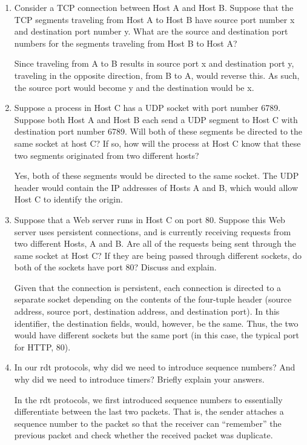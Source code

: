 \begin{enumerate}

  \item Consider a TCP connection between Host A and Host B. Suppose that the TCP segments traveling from Host A to Host B have source port number x and destination port number y. What are the source and destination port numbers for the segments traveling from Host B to Host A?  

    Since traveling from A to B results in source port x and destination port y, traveling in the opposite direction, from B to A, would reverse this. As such, the source port would become y and the destination would be x.

  \item Suppose a process in Host C has a UDP socket with port number 6789. Suppose both Host A and Host B each send a UDP segment to Host C with destination port number 6789. Will both of these segments be directed to the same socket at host C? If so, how will the process at Host C know that these two segments originated from two different hosts?

    Yes, both of these segments would be directed to the same socket. The UDP header would contain the IP addresses of Hosts A and B, which would allow Host C to identify the origin.

  \item Suppose that a Web server runs in Host C on port 80. Suppose this Web server uses persistent connections, and is currently receiving requests from two different Hosts, A and B. Are all of the requests being sent through the same socket at Host C? If they are being passed through different sockets, do both of the sockets have port 80? Discuss and explain.

    Given that the connection is persistent, each connection is directed to a separate socket depending on the contents of the four-tuple header (source address, source port, destination address, and destination port). In this identifier, the destination fields, would, however, be the same. Thus, the two would have different sockets but the same port (in this case, the typical port for HTTP, 80).

  \item In our rdt protocols, why did we need to introduce sequence numbers? And why did we need to introduce timers? Briefly explain your answers.

    In the rdt protocols, we first introduced sequence numbers to essentially differentiate between the last two packets. That is, the sender attaches a sequence number to the packet so that the receiver can ``remember'' the previous packet and check whether the received packet was duplicate. 


\end{enumerate}
